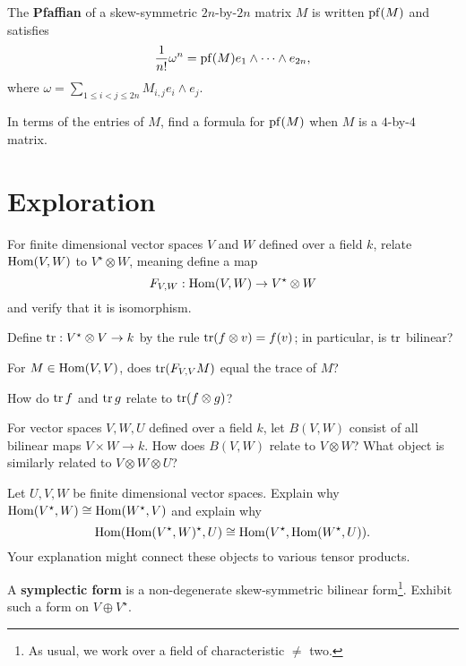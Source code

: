 \documentclass{homework}
\begin{document}
\begin{problem}\label{pfaffian-definition}The \textbf{Pfaffian} of a skew-symmetric $2n$-by-$2n$ matrix $M$ is written $\operatorname{pf}(M)$ and satisfies
  \[
    \frac{1}{n!} \omega^n = \operatorname{pf}(M) e_1 \wedge \cdots \wedge e_{2n},
  \]
  where $\omega = \displaystyle\sum_{1 \leq i < j \leq 2n} M_{i,j} e_i \wedge e_j$.

  In terms of the entries of $M$, find a formula for $\operatorname{pf}(M)$ when $M$
  is a $4$-by-$4$ matrix.
\end{problem}

\section{Exploration}

\begin{problem}\label{tensor-versus-hom}For finite dimensional vector spaces $V$ and $W$ defined over a
  field $k$, relate $\operatorname{Hom}(V,W)$ to $V^\star \otimes W$, meaning define
  a map
  \[
    F_{V,W} : \operatorname{Hom}(V,W) \to V^\star \otimes W
  \]
  and verify that it is isomorphism.
  
  Define $\operatorname{tr} : V^\star \otimes V \to k$ by the rule
  $\operatorname{tr}(f \otimes v) = f(v)$; in particular, is $\operatorname{tr}$ bilinear?

  For $M \in \operatorname{Hom}(V,V)$, does $\operatorname{tr} (F_{V,V} M)$ equal the trace of
  $M$?  
\end{problem}

\begin{problem}
  How do $\operatorname{tr} f$ and $\operatorname{tr} g$ relate to $\operatorname{tr} (f \otimes g)$?
\end{problem}

\begin{problem}\label{tensor-versus-bilinear-forms}For vector spaces $V, W, U$ defined over a field $k$, let $B(V,W)$
  consist of all bilinear maps $V \times W \to k$.  How does $B(V,W)$
  relate to $V \otimes W$?  What object is similarly related to
  $V \otimes W \otimes U$?
\end{problem}

\begin{problem}
  Let $U, V, W$ be finite dimensional vector spaces. Explain why \(\operatorname{Hom}(V^\star,W) \cong \operatorname{Hom}(W^\star,V)\) and explain why
  \[
    \operatorname{Hom}(\operatorname{Hom}(V^\star,W)^\star,U) \cong \operatorname{Hom}(V^\star,\operatorname{Hom}(W^\star,U)).
  \]
  Your explanation might connect these objects to various tensor products.
\end{problem}

\begin{problem}\label{symplectic-form-on-v-plus-v}A \textbf{symplectic form} is a non-degenerate skew-symmetric bilinear form\footnote{As usual, we work over a field of characteristic $\neq$ two.}.  Exhibit such a form on $V \oplus V^\star$.
\end{problem}
\end{document}
